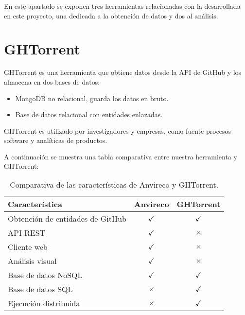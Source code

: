 
En este apartado se exponen tres herramientas relacionadas con la desarrollada en este proyecto, una dedicada a la obtención de datos y dos al análisis.

\section{GHTorrent}

GHTorrent \cite{Gousi13} es una herramienta que obtiene datos desde la API de GitHub y los almacena en dos bases de datos:

\begin{itemize}
	\item MongoDB no relacional, guarda los datos en bruto.
	\item Base de datos relacional con entidades enlazadas.
\end{itemize}

GHTorrent es utilizado por investigadores y empresas, como fuente procesos software y analíticas de productos.

A continuación se muestra una tabla comparativa entre nuestra herramienta y GHTorrent:

\begin{table}[H]
\centering
\begin{tabular}{lcc}
\toprule
Característica & Anvireco & GHTorrent \\
\midrule
Obtención de entidades de GitHub & \cellcolor{green!25} {$\checkmark$} & \cellcolor{green!25} {$\checkmark$} \\
API REST & \cellcolor{green!25} {$\checkmark$} & \cellcolor{red!25} {$\times$} \\
Cliente web & \cellcolor{green!25} {$\checkmark$} & \cellcolor{red!25} {$\times$} \\
Análisis visual & \cellcolor{green!25} {$\checkmark$} & \cellcolor{red!25} {$\times$} \\
Base de datos NoSQL & \cellcolor{green!25} {$\checkmark$} & \cellcolor{green!25} {$\checkmark$} \\
Base de datos SQL & \cellcolor{red!25} {$\times$} & \cellcolor{green!25} {$\checkmark$} \\
Ejecución distribuida & \cellcolor{red!25} {$\times$} & \cellcolor{green!25} {$\checkmark$} \\
\bottomrule
\end{tabular}
\caption{Comparativa de las características de Anvireco y GHTorrent.}
\label{comparativa-anvireco-ghtorrent}
\end{table}

